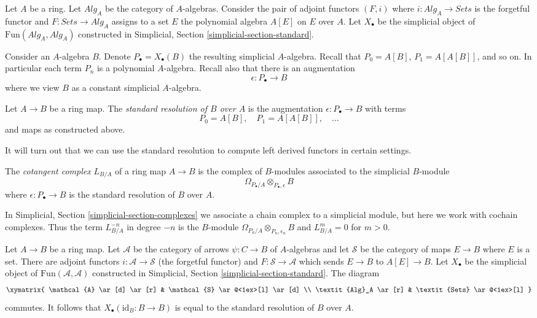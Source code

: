 \noindent
Let $A$ be a ring. Let $\textit{Alg}_A$ be the category of $A$-algebras.
Consider the pair of adjoint functors $(F, i)$ where
$i : \textit{Alg}_A \to \textit{Sets}$ is the forgetful functor and
$F : \textit{Sets} \to \textit{Alg}_A$ assigns to a set $E$ the polynomial
algebra $A[E]$ on $E$ over $A$. Let $X_\bullet$ be the simplicial object of
$\text{Fun}(\textit{Alg}_A, \textit{Alg}_A)$ constructed in
Simplicial, Section \ref{simplicial-section-standard}.

\medskip\noindent
Consider an $A$-algebra $B$. Denote $P_\bullet = X_\bullet(B)$ the resulting
simplicial $A$-algebra. Recall that $P_0 = A[B]$, $P_1 = A[A[B]]$, and so on.
In particular each term $P_n$ is a polynomial $A$-algebra.
Recall also that there is an augmentation
$$
\epsilon : P_\bullet \longrightarrow B
$$
where we view $B$ as a constant simplicial $A$-algebra.

\begin{definition}
\label{definition-standard-resolution}
Let $A \to B$ be a ring map. The {\it standard resolution of $B$ over $A$}
is the augmentation $\epsilon : P_\bullet \to B$ with terms
$$
P_0 = A[B],\quad P_1 = A[A[B]],\quad \ldots
$$
and maps as constructed above.
\end{definition}

\noindent
It will turn out that we can use the standard resolution
to compute left derived functors in certain settings.

\begin{definition}
\label{definition-cotangent-complex-ring-map}
The {\it cotangent complex} $L_{B/A}$ of a ring map $A \to B$
is the complex of $B$-modules associated to the simplicial $B$-module
$$
\Omega_{P_\bullet/A} \otimes_{P_\bullet, \epsilon} B
$$
where $\epsilon : P_\bullet \to B$ is the standard resolution
of $B$ over $A$.
\end{definition}

\noindent
In Simplicial, Section \ref{simplicial-section-complexes} we associate a
chain complex to a simplicial module, but here we work with cochain complexes.
Thus the term $L_{B/A}^{-n}$ in degree $-n$ is the $B$-module
$\Omega_{P_n/A} \otimes_{P_n, \epsilon_n} B$ and $L_{B/A}^m = 0$
for $m > 0$.

\begin{remark}
\label{remark-variant-cotangent-complex}
Let $A \to B$ be a ring map. Let $\mathcal{A}$ be the category of
arrows $\psi : C \to B$ of $A$-algebras and let $\mathcal{S}$ be
the category of maps $E \to B$ where $E$ is a set. There are adjoint
functors $i : \mathcal{A} \to \mathcal{S}$ (the forgetful functor)
and $F : \mathcal{S} \to \mathcal{A}$ which sends $E \to B$ to
$A[E] \to B$. Let $X_\bullet$ be the simplicial object of
$\text{Fun}(\mathcal{A}, \mathcal{A})$ constructed in
Simplicial, Section \ref{simplicial-section-standard}.
The diagram
$$
\xymatrix{
\mathcal{A} \ar[d] \ar[r] & \mathcal{S} \ar@<1ex>[l] \ar[d] \\
\textit{Alg}_A \ar[r] & \textit{Sets} \ar@<1ex>[l]
}
$$
commutes. It follows that $X_\bullet(\text{id}_B : B \to B)$
is equal to the standard resolution of $B$ over $A$.
\end{remark}

